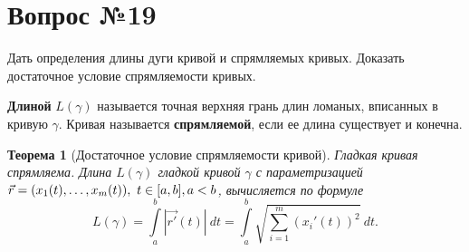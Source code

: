 \documentclass[12pt]{report}
\numberwithin{equation}{section}
\newtheorem{theorem}{Теорема}[section]
\begin{document}
\newpage \section{Вопрос №19} %
\begin{framed}
Дать определения длины дуги кривой и спрямляемых кривых. Доказать достаточное условие спрямляемости кривых.
\end{framed}

\textbf{Длиной} $L(\gamma)$ называется точная верхняя грань длин ломаных, вписанных в кривую $\gamma$. Кривая называется \textbf{спрямляемой}, если ее длина существует и конечна.

\begin{theorem}[Достаточное условие спрямляемости кривой] \label{th:19:1}
Гладкая кривая спрямляема. Длина $L(\gamma)$ гладкой кривой $\gamma$ с параметризацией $\vec{r} = (x_1(t),\ldots,x_m(t)),~t\in[a,b],\\a < b$, вычисляется по формуле
\[ L(\gamma) = \int\limits_a^b |\vec{r'}(t)|~dt = \int\limits_a^b \sqrt{\sum_{i=1}^m (x_i'(t))^2}~dt.\]
\end{theorem}
\end{document}
